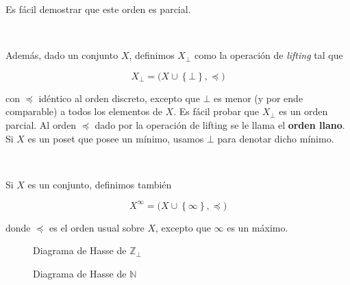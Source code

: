 \documentclass[article, 12pt]{article}
\begin{document}
Es fácil demostrar que este orden es parcial. 

~ 

Además, dado un conjunto $X$, definimos $X_\bot $ como la operación de
\textit{lifting} tal que 

\begin{equation*}
  X_\bot = \Big( X \cup \left\{ \bot  \right\}, \preceq  \Big)
\end{equation*}

con $\preceq$ idéntico al orden discreto, excepto que $\bot$ es menor (y por
ende comparable) a todos los elementos de $X$. Es fácil probar que $X_\bot $ es
un orden parcial. Al orden $\preceq$ dado por la operación de lifting se le
llama el \textbf{orden llano}. Si $X$ es un poset que posee un mínimo, usamos
$\bot $ para denotar dicho mínimo.

~ 

Si $X$ es un conjunto, definimos también 

\begin{equation*}
  X^\infty = \Big( X \cup \left\{ \infty \right\}, \preceq \Big)
\end{equation*}

donde $\preceq$ es el orden usual sobre $X$, excepto que $\infty$ es un máximo.


\begin{figure}[!h]
\centering
{}
\caption{Diagrama de Hasse de $\mathbb{Z}_\bot $}
\end{figure} 


\begin{figure}[!h]
\centering
{}
\caption{Diagrama de Hasse de $\mathbb{N}$}
\end{figure} 
\end{document}
